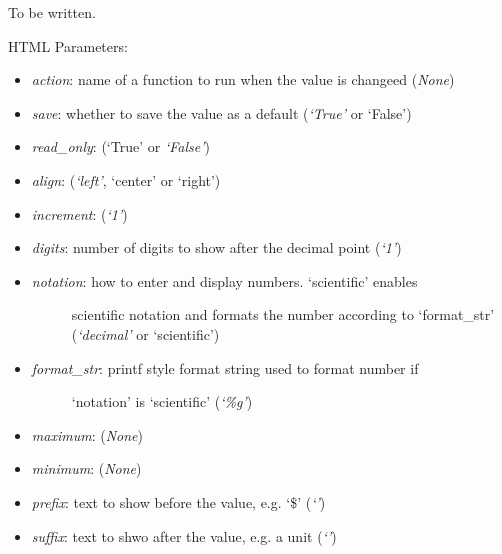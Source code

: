 \documentclass[letterpaper,10pt,english]{sphinxmanual}
\begin{document}
\begin{fulllineitems}
\label{api:controls.NumBox}
To be written.

HTML Parameters:
\begin{itemize}
\item {} 
\emph{action}: name of a function to run when the value is changeed (\emph{None})

\item {} 
\emph{save}: whether to save the value as a default (\emph{`True'} or `False')

\item {} 
\emph{read\_only}: (`True' or \emph{`False'})

\item {} 
\emph{align}: (\emph{`left'}, `center' or `right')

\item {} 
\emph{increment}: (\emph{`1'})

\item {} 
\emph{digits}: number of digits to show after the decimal point (\emph{`1'})

\item {} \begin{description}
\item[{\emph{notation}: how to enter and display numbers. `scientific' enables }] \leavevmode
scientific notation and formats the number according to `format\_str'
(\emph{`decimal'} or `scientific')

\end{description}

\item {} \begin{description}
\item[{\emph{format\_str}: printf style format string used to format number if }] \leavevmode
`notation' is `scientific' (\emph{`\%g'})

\end{description}

\item {} 
\emph{maximum}: (\emph{None})

\item {} 
\emph{minimum}: (\emph{None})

\item {} 
\emph{prefix}: text to show before the value, e.g. `\$' (\emph{`'})

\item {} 
\emph{suffix}: text to shwo after the value, e.g. a unit (\emph{`'})


\end{itemize}
\end{fulllineitems}
\end{document}
